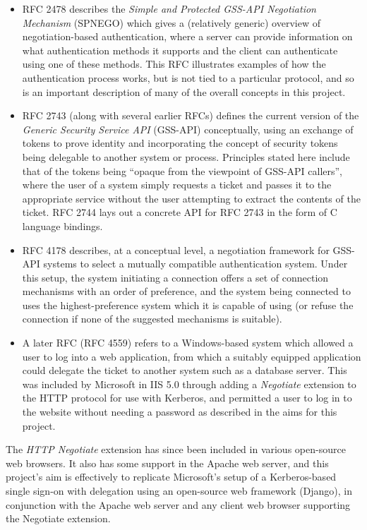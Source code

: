 \documentclass[12pt]{report}
\begin{document}
\begin{itemize}
\item
  RFC 2478\cite{RFC2478} describes the \textit{Simple and Protected GSS-API Negotiation Mechanism} (SPNEGO) which gives a (relatively generic) overview of negotiation-based authentication, where a server can provide information on what authentication methods it supports and the client can authenticate using one of these methods. This RFC illustrates examples of how the authentication process works, but is not tied to a particular protocol, and so is an important description of many of the overall concepts in this project.
\item
  RFC 2743\cite{RFC2743} (along with several earlier RFCs) defines the current version of the \textit{Generic Security Service API} (GSS-API) conceptually, using an exchange of tokens to prove identity and incorporating the concept of security tokens being delegable to another system or process. Principles stated here include that of the tokens being ``opaque from the viewpoint of GSS-API callers'', where the user of a system simply requests a ticket and passes it to the appropriate service without the user attempting to extract the contents of the ticket. RFC 2744\cite{RFC2744} lays out a concrete API for RFC 2743 in the form of C language bindings.
\item
  RFC 4178\cite{RFC4178} describes, at a conceptual level, a negotiation framework for GSS-API systems to select a mutually compatible authentication system. Under this setup, the system initiating a connection offers a set of connection mechanisms with an order of preference, and the system being connected to uses the highest-preference system which it is capable of using (or refuse the connection if none of the suggested mechanisms is suitable).
\item
  A later RFC (RFC 4559\cite{RFC4559}) refers to a Windows-based system which allowed a user to log into a web application, from which a suitably equipped application could delegate the ticket to another system such as a database server. This was included by Microsoft in IIS 5.0 through adding a \textit{Negotiate} extension to the HTTP protocol for use with Kerberos, and permitted a user to log in to the website without needing a password as described in the aims for this project.
\end{itemize}

The \textit{HTTP Negotiate} extension has since been included in various open-source web browsers. It also has some support in the Apache web server, and this project's aim is effectively to replicate Microsoft's setup of a Kerberos-based single sign-on with delegation using an open-source web framework (Django), in conjunction with the Apache web server and any client web browser supporting the Negotiate extension.
\end{document}
